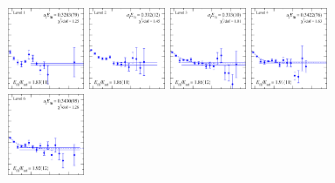 \begin{figure}[H]
    \includegraphics[width=0.18\textwidth]{figures/sigmas/hu/fits/fit_0.pdf}
    \includegraphics[width=0.18\textwidth]{figures/sigmas/hu/fits/fit_8.pdf}
    \includegraphics[width=0.18\textwidth]{figures/sigmas/hu/fits/fit_3.pdf}
    \includegraphics[width=0.18\textwidth]{figures/sigmas/hu/fits/fit_1.pdf}\\
    \includegraphics[width=0.18\textwidth]{figures/sigmas/hu/fits/fit_2.pdf}

\end{figure}
